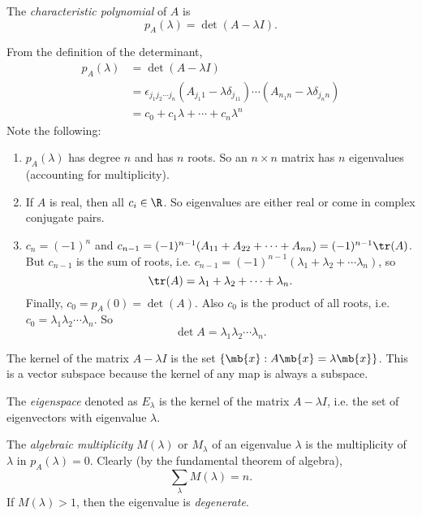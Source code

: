 \documentclass[a4paper]{article}
\begin{document}
\begin{defi}
  The \emph{characteristic polynomial} of $A$ is
  \[
  p_A(\lambda) = \det(A - \lambda I).
  \]
\end{defi}

From the definition of the determinant,
\begin{align*}
  p_A(\lambda) &= \det(A - \lambda I)\\
  &= \epsilon_{j_1j_2\cdots j_n} (A_{j_1 1} - \lambda\delta_{j_11})\cdots (A_{n_1 n} - \lambda\delta_{j_nn})\\
  &= c_0 + c_1\lambda + \cdots + c_n\lambda^n
\end{align*}
Note the following:
\begin{enumerate}
\item $p_A(\lambda)$ has degree $n$ and has $n$ roots. So an $n\times n$ matrix has $n$ eigenvalues (accounting for multiplicity).
\item If $A$ is real, then all $c_i\in \R$. So eigenvalues are either real or come in complex conjugate pairs.
\item $c_n = (-1)^n$ and $c_{n - 1} = (-1)^{n - 1}(A_{11} + A_{22} + \cdots + A_{nn}) = (-1)^{n - 1}\tr(A)$. But $c_{n -1}$ is the sum of roots, i.e. $c_{n - 1}= (-1)^{n - 1}(\lambda_1 + \lambda_2 + \cdots \lambda_n)$, so
\[
\tr(A) = \lambda_1 + \lambda_2 + \cdots + \lambda_n.
\]
Finally, $c_0 = p_A(0) = \det(A)$. Also $c_0$ is the product of all roots, i.e. $c_0 = \lambda_1\lambda_2\cdots \lambda_n$. So
\[
\det A = \lambda_1\lambda_2\cdots \lambda_n.
\]
\end{enumerate}

The kernel of the matrix $A - \lambda I$ is the set $\{\mb{x}: A\mb{x} = \lambda\mb{x}\}$. This is a vector subspace because the kernel of any map is always a subspace.

\begin{defi}[Eigenspace]
  The \emph{eigenspace} denoted as $E_\lambda$ is the kernel of the matrix $A - \lambda I$, i.e. the set of eigenvectors with eigenvalue $\lambda$.
\end{defi}

\begin{defi}
  The \emph{algebraic multiplicity} $M(\lambda)$ or $M_\lambda$ of an eigenvalue $\lambda$ is the multiplicity of $\lambda$ in $p_A(\lambda) = 0$. Clearly (by the fundamental theorem of algebra),
  \[
  \sum_\lambda M(\lambda) = n.
  \]
  If $M(\lambda) > 1$, then the eigenvalue is \emph{degenerate}.
\end{defi}
\end{document}
